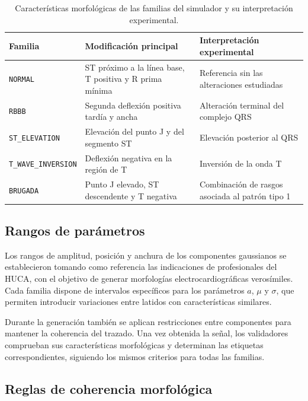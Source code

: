 \begin{table}[H]
\centering
\small
\begin{tabularx}{\textwidth}{p{3.25cm} p{4.65cm} X}
\toprule
\textbf{Familia} & \textbf{Modificación principal} & \textbf{Interpretación experimental} \\
\midrule
\texttt{NORMAL} & ST próximo a la línea base, T positiva y R prima mínima & Referencia sin las alteraciones estudiadas \\
\texttt{RBBB} & Segunda deflexión positiva tardía y ancha & Alteración terminal del complejo QRS \\
\texttt{ST\_ELEVATION} & Elevación del punto J y del segmento ST & Elevación posterior al QRS \\
\texttt{T\_WAVE\_INVERSION} & Deflexión negativa en la región de T & Inversión de la onda T \\
\texttt{BRUGADA} & Punto J elevado, ST descendente y T negativa & Combinación de rasgos asociada al patrón tipo 1 \\
\bottomrule
\end{tabularx}
\caption{Características morfológicas de las familias del simulador y su interpretación experimental.}
\label{tab:familias}
\end{table}

\subsection{Rangos de parámetros}

Los rangos de amplitud, posición y anchura de los componentes gaussianos se establecieron tomando como referencia las indicaciones de profesionales del HUCA, con el objetivo de generar morfologías electrocardiográficas verosímiles. Cada familia dispone de intervalos específicos para los parámetros \(a\), \(\mu\) y \(\sigma\), que permiten introducir variaciones entre latidos con características similares.

Durante la generación también se aplican restricciones entre componentes para mantener la coherencia del trazado. Una vez obtenida la señal, los validadores comprueban sus características morfológicas y determinan las etiquetas correspondientes, siguiendo los mismos criterios para todas las familias.

\subsection{Reglas de coherencia morfológica}

